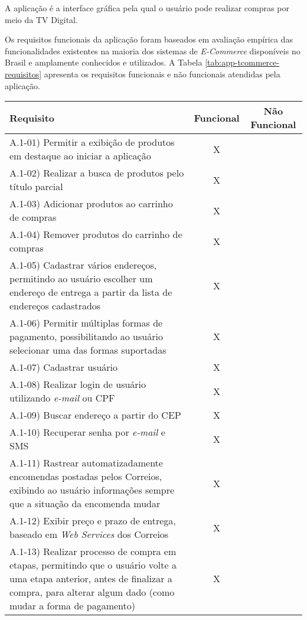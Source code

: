 A aplicação é a interface gráfica pela qual o usuário pode realizar
compras por meio da TV Digital.

Os requisitos funcionais da aplicação foram baseados em avaliação
empírica das funcionalidades existentes na maioria dos sistemas de \textit{E-Commerce}
disponíveis no Brasil e amplamente conhecidos e utilizados.
A Tabela \ref{tab:app-tcommerce-requisitos} apresenta os requisitos funcionais e não funcionais atendidas pela aplicação.

\begin{center}
\scriptsize {
	\begin{tabular}{|p{11cm}|c|c|}
		\hline 
  		\textbf{Requisito} & \textbf{Funcional} & \textbf{Não Funcional} \\
		\hline
	  	A.1-01) Permitir a exibição de produtos em destaque ao iniciar a aplicação &  X &    \\
		\hline
		  A.1-02) Realizar a busca de produtos pelo título parcial &  X &    \\
		\hline
		  A.1-03) Adicionar produtos ao carrinho de compras &  X &    \\
		\hline
		  A.1-04) Remover produtos do carrinho de compras &  X &    \\
		\hline
		  A.1-05) Cadastrar vários endereços, permitindo ao usuário escolher um endereço
		   de entrega a partir da lista de endereços cadastrados &  X &    \\
		\hline
		  A.1-06) Permitir múltiplas formas de pagamento, possibilitando ao usuário selecionar uma das formas
		   suportadas &  X &    \\
		\hline
		  A.1-07) Cadastrar usuário &  X &    \\
		\hline
		  A.1-08) Realizar login de usuário utilizando \textit{e-mail} ou CPF &  X &    \\
		\hline
		  A.1-09) Buscar endereço a partir do CEP &  X &    \\
		\hline
		  A.1-10) Recuperar senha por \textit{e-mail} e SMS &  X &    \\
		\hline
		  A.1-11) Rastrear automatizadamente encomendas postadas pelos Correios,
		   exibindo ao usuário informações sempre que a situação
		   da encomenda mudar &  X &    \\
		\hline
		  A.1-12) Exibir preço e prazo de entrega, baseado em \textit{Web Services} dos Correios &  X &    \\
		\hline
		  A.1-13) Realizar processo de compra em etapas, permitindo que o usuário volte a uma etapa anterior,
		   antes de finalizar a compra, para alterar algum dado (como mudar a forma de pagamento) &  X &    \\

\end{tabular}}
\end{center}
